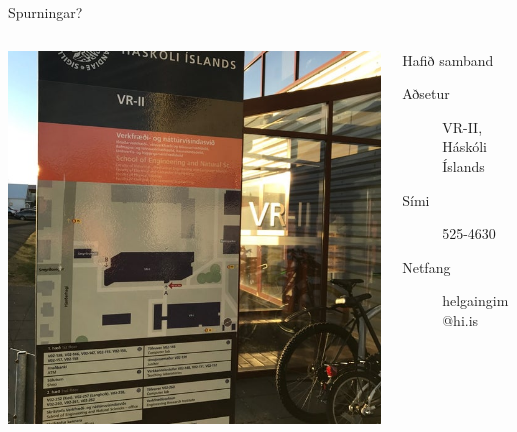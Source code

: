 \documentclass[
    NAME={Dr. Helga Ingimundardóttir},
    EMAIL={helgaingim@hi.is},
    FACULTY={Iðnaðarverkfræðideild},
    TITLE={Spáum fyrir um framtíð gervigreindar},
    SUBTITLE={út frá akademísku sjónarmiði},
    SEMINAR={Stjórnvísi},
    DATE={22. febrúar 2025},
    WIDE=true,
    ICELANDIC=true
]{HI-LaTeX/hi-beamer}
\begin{document}
\begin{frame}{Spurningar?}
    \begin{columns}        
        \begin{column}{0.5\textwidth} 
        \includegraphics[height=\textwidth]{myndir/vr2.jpg}
        \end{column}
        \hfill
        \begin{column}{0.4\textwidth} 
        
            \begin{alertblock}{Hafið samband}
            \begin{description}
                \item[Aðsetur] VR-II, Háskóli Íslands
                \item[Sími] 525-4630
                \item[Netfang] helgaingim@hi.is
            \end{description}
            \end{alertblock}
        \end{column}
    \end{columns}    
\end{frame}
\end{document}
